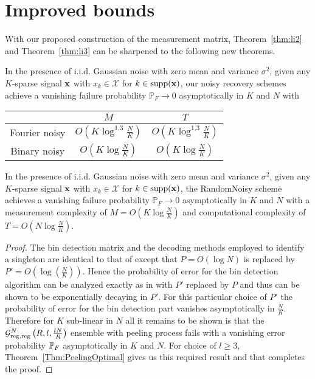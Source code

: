 \section{Improved bounds}
With our proposed construction of the measurement matrix, Theorem~\ref{thm:li2} and Theorem~\ref{thm:li3} can be sharpened to the following new theorems.
\begin{theorem}\label{Thm:ourSubLinearNoisy}  In the presence of i.i.d. Gaussian noise with zero mean and
variance $\sigma^2$, given any $K$-sparse signal $\mathbf{x}$ with $x_k \in \mathcal{X}$ for $k \in \text{supp} (\mathbf{x})$, our noisy recovery schemes achieve a vanishing failure probability $\mathbb{P}_F \rightarrow 0$ asymptotically in $K$ and $N$ with
\begin{center}
\begin{tabular}{|c|c|c|}
  \hline
   & $M$ &  $T$ \\
  \hline
  Fourier noisy & $O\left(K \log^{1.3} \frac{N}{K} \right)$ & $O\left(K \log^{1.3} \frac{N}{K} \right)$ \\
  \hline
  Binary noisy & $O\left(K \log \frac{N}{K} \right)$  & $O\left(K \log \frac{N}{K} \right)$ \\
  \hline
\end{tabular}
\end{center}
\end{theorem}

\begin{theorem} \label{Thm:ourNearLinearNoisy} In the presence of i.i.d. Gaussian noise with zero mean and
variance $\sigma^2$, given any $K$-sparse signal $\mathbf{x}$ with $x_k \in \mathcal{X}$ for $k \in \text{supp} (\mathbf{x})$, the RandomNoisy scheme achieves a vanishing failure probability $\mathbb{P}_F \rightarrow 0$ asymptotically in $K$ and $N$ with a measurement complexity of $M = O \left( K \log \frac{N}{K} \right)$ and computational complexity of $T = O \left( N \log \frac{N}{K} \right)$.
\end{theorem}

\begin{proof}
The bin detection matrix and the decoding methods employed to identify a singleton are identical to that of \cite{li2015subdraft} except that $P=O(\log N)$ is replaced by $P'=O\left(\log(\frac{N}{K})\right)$. Hence the probability of error for the bin detection algorithm can be analyzed exactly as in \cite{li2015subdraft} with $P'$ replaced by $P$ and thus can be shown to be exponentially decaying in $P'$. For this particular choice of $P'$ the probability of error for the bin detection part vanishes asymptotically in $\frac{N}{K}$. Therefore for $K$ sub-linear in $N$ all it remains to be shown is that the $\mathcal{G}^N_{\rm reg,reg}\left(R,l, \frac{lN}{R} \right)$ ensemble with peeling process fails with a vanishing error probability $\mathbb{P}_F$ asymptotically in $K$ and $N$. For choice of $l\geq 3$,  Theorem~\ref{Thm:PeelingOptimal} gives us this required result and that completes the proof.
\end{proof}

